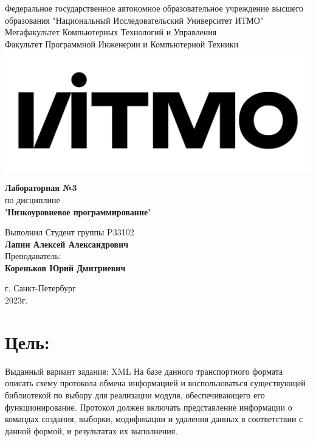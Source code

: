 \documentclass[12pt,onecolumn]{article}
\begin{document}
\setcounter{tocdepth}{4}
\begin{center}
    Федеральное государственное автономное образовательное учреждение высшего образования "Национальный Исследовательский Университет ИТМО"\\ 
    Мегафакультет Компьютерных Технологий и Управления\\
    Факультет Программной Инженерии и Компьютерной Техники \\
    \includegraphics[scale=0.3]{image/itmo.jpg} %
\end{center}
\vspace{1cm}


\begin{center}
    \textbf{Лабораторная №3}\\
    по дисциплине\\
    \textbf{'Низкоуровневое программирование'}
\end{center}

\vspace{2cm}

\begin{flushright}
  Выполнил Студент  группы P33102\\
  \textbf{Лапин Алексей Александрович}\\
  Преподаватель: \\
  \textbf{Кореньков Юрий Дмитриевич}\\
\end{flushright}

\vspace{6cm}
\begin{center}
    г. Санкт-Петербург\\
    2023г.
\end{center}

\newpage
\tableofcontents
\newpage

\section{Цель:}
Выданный вариант задания: XML
На базе данного транспортного формата описать схему протокола обмена информацией и воспользоваться существующей библиотекой по выбору для реализации модуля, обеспечивающего его функционирование.
Протокол должен включать представление информации о командах создания, выборки, модификации и удаления данных в соответствии с данной формой, и результатах их выполнения.
\end{document}
